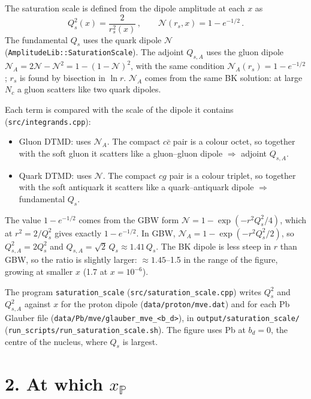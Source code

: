 \documentclass[12pt]{article}
\newcommand{\xpo}{x_{\mathbb{P}}}
\begin{document}
The saturation scale is defined from the dipole amplitude at each $x$ as
\begin{equation}
Q_s^2(x)=\frac{2}{r_s^2(x)}\,,\qquad \mathcal{N}(r_s,x)=1-e^{-1/2}\,.
\end{equation}
The fundamental $Q_s$ uses the quark dipole $\mathcal{N}$ (\texttt{AmplitudeLib::SaturationScale}). The
adjoint $Q_{s,A}$ uses the gluon dipole $\mathcal{N}_A=2\mathcal{N}-\mathcal{N}^2=1-(1-\mathcal{N})^2$,
with the same condition $\mathcal{N}_A(r_s)=1-e^{-1/2}$; $r_s$ is found by bisection in $\ln r$.
$\mathcal{N}_A$ comes from the same BK solution: at large $N_c$ a gluon scatters like two quark dipoles.

Each term is compared with the scale of the dipole it contains (\texttt{src/integrands.cpp}):
\begin{itemize}
\item Gluon DTMD: uses $\mathcal{N}_A$. The compact $c\bar c$ pair is a colour octet, so together with
  the soft gluon it scatters like a gluon--gluon dipole $\Rightarrow$ adjoint $Q_{s,A}$.
\item Quark DTMD: uses $\mathcal{N}$. The compact $cg$ pair is a colour triplet, so together with the
  soft antiquark it scatters like a quark--antiquark dipole $\Rightarrow$ fundamental $Q_s$.
\end{itemize}

The value $1-e^{-1/2}$ comes from the GBW form $\mathcal{N}=1-\exp(-r^2Q_s^2/4)$, which at
$r^2=2/Q_s^2$ gives exactly $1-e^{-1/2}$. In GBW,
$\mathcal{N}_A=1-\exp(-r^2Q_s^2/2)$, so $Q_{s,A}^2=2Q_s^2$ and $Q_{s,A}=\sqrt2\,Q_s\approx1.41\,Q_s$.
The BK dipole is less steep in $r$ than GBW, so the ratio is slightly larger: $\approx1.45$--1.5 in the
range of the figure, growing at smaller $x$ (1.7 at $x=10^{-6}$).

The program \texttt{saturation\_scale} (\texttt{src/saturation\_scale.cpp}) writes $Q_s^2$ and
$Q_{s,A}^2$ against $x$ for the proton dipole (\texttt{data/proton/mve.dat}) and for each Pb Glauber file
(\texttt{data/Pb/mve/glauber\_mve\_<b\_d>}), in \texttt{output/saturation\_scale/}
(\texttt{run\_scripts/run\_saturation\_scale.sh}). The figure uses Pb at $b_d=0$, the centre of the
nucleus, where $Q_s$ is largest.

\section*{2. At which $\xpo$}
\end{document}
